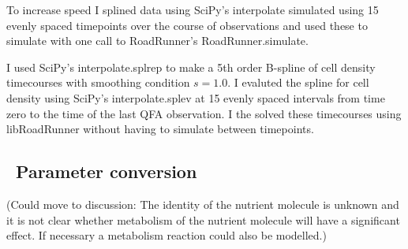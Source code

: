 To increase speed I splined data using SciPy's interpolate simulated
using 15 evenly spaced timepoints over the course of observations and
used these to simulate with one call to RoadRunner's
RoadRunner.simulate.

I used SciPy's interpolate.splrep to make a 5th order B-spline of cell
density timecourses with smoothing condition \(s=1.0\). I evaluted the
spline for cell density using SciPy's interpolate.splev at 15 evenly
spaced intervals from time zero to the time of the last QFA
observation. I the solved these timecourses using libRoadRunner
without having to simulate between timepoints.








\subsection{\thesubsection~Parameter conversion}

(Could move to discussion: The identity of the
nutrient molecule is unknown and it is not clear whether metabolism of
the nutrient molecule will have a significant effect. If necessary a
metabolism reaction could also be modelled.)\\

